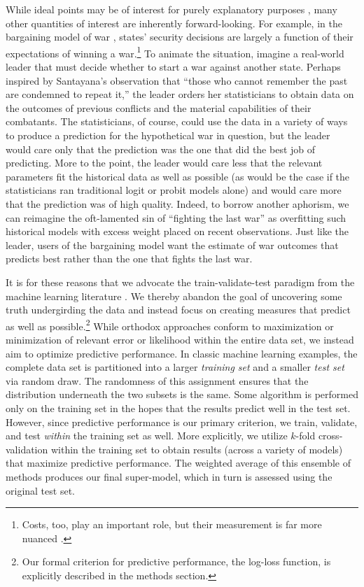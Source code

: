 While ideal points may be of interest for purely explanatory purposes \citep{clarke2012}, many other quantities of interest are inherently forward-looking.  For example, in the bargaining model of war \citep{fearon1995}, states' security decisions are largely a function of their expectations of winning a war.\footnote{Costs, too, play an important role, but their measurement is far more nuanced \citep{stiglitz2008,stiglitz2012}.}  To animate the situation, imagine a real-world leader that must decide whether to start a war against another state.  Perhaps inspired by Santayana's observation that ``those who cannot remember the past are condemned to repeat it,'' the leader orders her statisticians to obtain data on the outcomes of previous conflicts and the material capabilities of their combatants.  The statisticians, of course, could use the data in a variety of ways to produce a prediction for the hypothetical war in question, but the leader would care only that the prediction was the one that did the best job of predicting.  More to the point, the leader would care less that the relevant parameters fit the historical data as well as possible (as would be the case if the statisticians ran traditional logit or probit models alone) and would care more that the prediction was of high quality.  Indeed, to borrow another aphorism, we can reimagine the oft-lamented sin of ``fighting the last war'' \citep[e.g.][]{hart1972} as overfitting such historical models with excess weight placed on recent observations.  Just like the leader, users of the bargaining model want the estimate of war outcomes that predicts best rather than the one that fights the last war.

It is for these reasons that we advocate the train-validate-test paradigm from the machine learning literature .  We thereby abandon the goal of uncovering some truth undergirding the data and instead focus on creating measures that predict as well as possible.\footnote{Our formal criterion for predictive performance, the log-loss function, is explicitly described in the methods section.}  While orthodox approaches conform to maximization or minimization of relevant error or likelihood within the entire data set, we instead aim to optimize predictive performance.  In classic machine learning examples, the complete data set is partitioned into a larger \emph{training set} and a smaller \emph{test set} via random draw.  The randomness of this assignment ensures that the distribution underneath the two subsets is the same.  Some algorithm is performed only on the training set in the hopes that the results predict well in the test set.  However, since predictive performance is our primary criterion, we train, validate, and test \emph{within} the training set as well.  More explicitly, we utilize $k$-fold cross-validation within the training set to obtain results (across a variety of models) that maximize predictive performance.  The weighted average of this ensemble of methods produces our final super-model, which in turn is assessed using the original test set.

